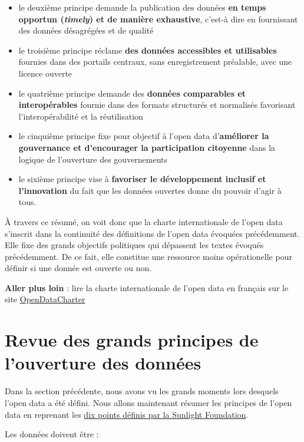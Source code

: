 \documentclass[]{book}
\theoremstyle{definition}
\theoremstyle{definition}
\theoremstyle{definition}
\theoremstyle{remark}
\begin{document}
\begin{itemize}
\item
  le deuxième principe demande la publication des données \textbf{en
  temps opportun (\emph{timely}) et de manière exhaustive}, c'est-à dire
  en fournissant des données désagrégées et de qualité
\item
  le troisième principe réclame \textbf{des données accessibles et
  utilisables} fournies dans des portails centraux, sans enregistrement
  préalable, avec une licence ouverte
\item
  le quatrième principe demande des \textbf{données comparables et
  interopérables} fournie dans des formats structurés et normalisés
  favorisant l'interopérabilité et la réutilisation
\item
  le cinquième principe fixe pour objectif à l'open data
  d'\textbf{améliorer la gouvernance et d'encourager la participation
  citoyenne} dans la logique de l'ouverture des gouvernements
\item
  le sixième principe vise à \textbf{favoriser le développement inclusif
  et l'innovation} du fait que les données ouvertes donne du pouvoir
  d'agir à tous.
\end{itemize}

À travers ce résumé, on voit donc que la charte internationale de l'open
data s'inscrit dans la continuité des définitions de l'open data
évoquées précédemment. Elle fixe des grands objectifs politiques qui
dépassent les textes évoqués précédemment. De ce fait, elle constitue
une ressource moins opérationelle pour définir si une donnée est ouverte
ou non.

\textbf{Aller plus loin} : lire la charte internationale de l'open data
en français sur le site
\href{https://opendatacharter.net/principles-fr/}{OpenDataCharter}

\section{Revue des grands principes de l'ouverture des
données}\label{revue-des-grands-principes-de-louverture-des-donnees}

Dans la section précédente, nous avons vu les grands moments lors
desquels l'open data a été défini. Nous allons maintenant résumer les
principes de l'open data en reprenant les
\href{https://sunlightfoundation.com/policy/documents/ten-open-data-principles/}{dix
points définis par la Sunlight Foundation}.

Les données doivent être :
\end{document}
